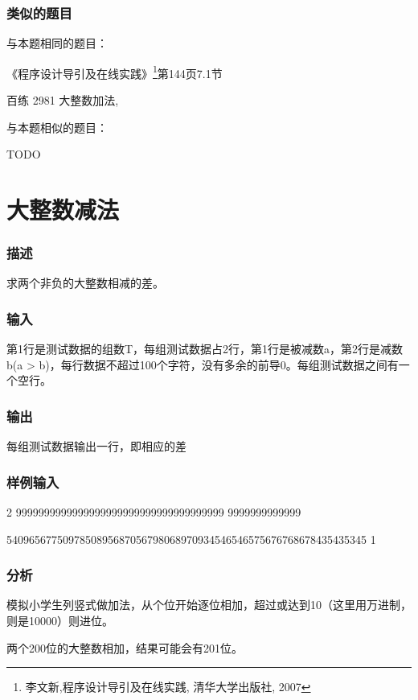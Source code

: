 \subsubsection{类似的题目}
与本题相同的题目：
\begindot
\item 《程序设计导引及在线实践》\footnote{李文新,程序设计导引及在线实践, 清华大学出版社, 2007}第144页7.1节
\item 百练 2981 大整数加法, 
\myenddot

与本题相似的题目：
\begindot
\item  TODO
\myenddot


\section{大整数减法} %
\subsubsection{描述}
求两个非负的大整数相减的差。

\subsubsection{输入}
第1行是测试数据的组数T，每组测试数据占2行，第1行是被减数a，第2行是减数b(a > b)，每行数据不超过100个字符，没有多余的前导0。每组测试数据之间有一个空行。

\subsubsection{输出}
每组测试数据输出一行，即相应的差

\subsubsection{样例输入}
\begin{Code}
2
9999999999999999999999999999999999999
9999999999999

5409656775097850895687056798068970934546546575676768678435435345
1
\end{Code}

\subsubsection{分析}
模拟小学生列竖式做加法，从个位开始逐位相加，超过或达到10（这里用万进制，则是10000）则进位。

两个200位的大整数相加，结果可能会有201位。

